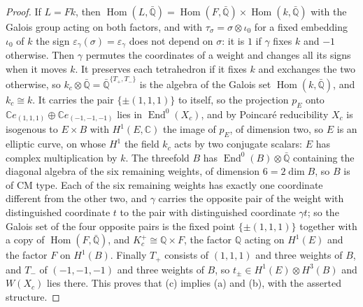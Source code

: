 \documentclass[11pt,reqno]{amsart}
\theoremstyle{plain}
\theoremstyle{definition}
\theoremstyle{remark}
\newcommand{\QQ}{\mathbb{Q}}
\newcommand{\CC}{\mathbb{C}}
\newcommand{\HW}{W}                      %
\DeclareMathOperator{\End}{End}
\begin{document}
\begin{proof}
If $L=Fk$, then $\operatorname{Hom}(L,\bar{\QQ})=\operatorname{Hom}(F,\bar{\QQ})
\times\operatorname{Hom}(k,\bar{\QQ})$ with the Galois group acting on both
factors, and with $\tau_{\sigma}=\sigma\otimes\iota_{0}$ for a fixed
embedding $\iota_{0}$ of $k$ the sign $\varepsilon_{\gamma}(\sigma)
=\varepsilon_{\gamma}$ does not depend on $\sigma$: it is $1$ if $\gamma$
fixes $k$ and $-1$ otherwise. Then $\gamma$ permutes the coordinates of a
weight and changes all its signs when it moves $k$. It preserves each
tetrahedron if it fixes $k$ and exchanges the two otherwise, so
$k_{c}\otimes\bar{\QQ}=\bar{\QQ}^{\{T_{+},T_{-}\}}$ is the algebra of the
Galois set $\operatorname{Hom}(k,\bar{\QQ})$, and $k_{c}\cong k$. It carries
the pair $\{\pm(1,1,1)\}$ to itself, so the projection $p_{E}$ onto
$\CC e_{(1,1,1)}\oplus\CC e_{(-1,-1,-1)}$ lies in $\End^{0}(X_{c})$, and by
Poincar\'e reducibility $X_{c}$ is isogenous to $E\times B$ with
$H^{1}(E,\CC)$ the image of $p_{E}$, of dimension two, so $E$ is an
elliptic curve, on whose $H^{1}$ the field $k_{c}$ acts by two conjugate
scalars: $E$ has complex multiplication by $k$. The threefold $B$ has
$\End^{0}(B)\otimes\bar{\QQ}$ containing the diagonal algebra of the six
remaining weights, of dimension $6=2\dim B$, so $B$ is of CM type. Each of
the six remaining weights has exactly one coordinate different from the
other two, and $\gamma$ carries the opposite pair of the weight with
distinguished coordinate $t$ to the pair with distinguished coordinate
$\gamma t$; so the Galois set of the four opposite pairs is the fixed point
$\{\pm(1,1,1)\}$ together with a copy of $\operatorname{Hom}(F,\bar{\QQ})$,
and $K_{c}^{+}\cong\QQ\times F$, the factor $\QQ$ acting on $H^{1}(E)$ and
the factor $F$ on $H^{1}(B)$. Finally $T_{+}$ consists of $(1,1,1)$ and
three weights of $B$, and $T_{-}$ of $(-1,-1,-1)$ and three weights of $B$,
so $t_{\pm}\in H^{1}(E)\otimes H^{3}(B)$ and $\HW(X_{c})$ lies there. This
proves that (c) implies (a) and (b), with the asserted structure.


\end{proof}
\end{document}
